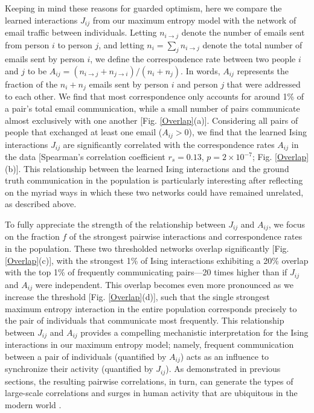 \documentclass[aps,reprint,superscriptaddress,amsmath,amssymb,longbibliography]{revtex4-1}
\begin{document}
Keeping in mind these reasons for guarded optimism, here we compare the learned interactions $J_{ij}$ from our maximum entropy model with the network of email traffic between individuals. Letting $n_{i\rightarrow j}$ denote the number of emails sent from person $i$ to person $j$, and letting $n_i = \sum_j n_{i\rightarrow j}$ denote the total number of emails sent by person $i$, we define the correspondence rate between two people $i$ and $j$ to be $A_{ij} = (n_{i\rightarrow j} + n_{j\rightarrow i})/(n_i + n_j)$. In words, $A_{ij}$ represents the fraction of the $n_i+n_j$ emails sent by person $i$ and person $j$ that were addressed to each other. We find that most correspondence only accounts for around 1\% of a pair's total email communication, while a small number of pairs communicate almost exclusively with one another [Fig. \ref{Overlap}(a)]. Considering all pairs of people that exchanged at least one email ($A_{ij} > 0$), we find that the learned Ising interactions $J_{ij}$ are significantly correlated with the correspondence rates $A_{ij}$ in the data [Spearman's correlation coefficient $r_s = 0.13$, $p=2\times 10^{-7}$; Fig. \ref{Overlap}(b)]. This relationship between the learned Ising interactions and the ground truth communication in the population is particularly interesting after reflecting on the myriad ways in which these two networks could have remained unrelated, as described above.

To fully appreciate the strength of the relationship between $J_{ij}$ and $A_{ij}$, we focus on the fraction $f$ of the strongest pairwise interactions and correspondence rates in the population. These two thresholded networks overlap significantly [Fig. \ref{Overlap}(c)], with the strongest 1\% of Ising interactions exhibiting a 20\% overlap with the top 1\% of frequently communicating pairs---20 times higher than if $J_{ij}$ and $A_{ij}$ were independent. This overlap becomes even more pronounced as we increase the threshold [Fig. \ref{Overlap}(d)], such that the single strongest maximum entropy interaction in the entire population corresponds precisely to the pair of individuals that communicate most frequently. This relationship between $J_{ij}$ and $A_{ij}$ provides a compelling mechanistic interpretation for the Ising interactions in our maximum entropy model; namely, frequent communication between a pair of individuals (quantified by $A_{ij}$) acts as an influence to synchronize their activity (quantified by $J_{ij}$). As demonstrated in previous sections, the resulting pairwise correlations, in turn, can generate the types of large-scale correlations and surges in human activity that are ubiquitous in the modern world \cite{Sornette-01,Deschatres-01,Candia-01,Crane-01,Peng-01,Bagrow-01}.
\end{document}
